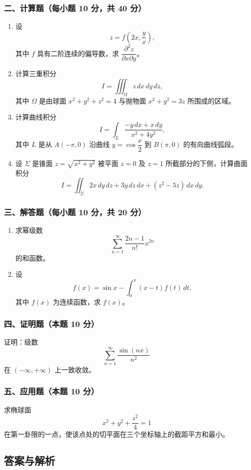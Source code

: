 \subsubsection*{二、计算题（每小题 10 分，共 40 分）}
\begin{enumerate}
  \item 设
  \[
  z=f\!\left(2x,\frac{y}{x}\right),
  \]
  其中 $f$ 具有二阶连续的偏导数，求 $\dfrac{\partial^2z}{\partial x\partial y}$。
  \item 计算三重积分
  \[
  I=\iiint_\Omega z\,dx\,dy\,dz,
  \]
  其中 $\Omega$ 是由球面 $x^2+y^2+z^2=4$ 与抛物面 $x^2+y^2=3z$ 所围成的区域。
  \item 计算曲线积分
  \[
  I=\int_L\frac{-y\,dx+x\,dy}{x^2+4y^2},
  \]
  其中 $L$ 是从 $A(-\pi,0)$ 沿曲线 $y=\cos\dfrac{x}{2}$ 到 $B(\pi,0)$ 的有向曲线弧段。
  \item 设 $\Sigma$ 是锥面 $z=\sqrt{x^2+y^2}$ 被平面 $z=0$ 及 $z=1$ 所截部分的下侧，计算曲面积分
  \[
  I=\iint_\Sigma 2x\,dy\,dz+3y\,dz\,dx+(z^2-5z)\,dx\,dy.
  \]
\end{enumerate}

\subsubsection*{三、解答题（每小题 10 分，共 20 分）}
\begin{enumerate}
  \item 求幂级数
  \[
  \sum_{n=1}^{\infty}\frac{2n-1}{n!}x^{2n}
  \]
  的和函数。
  \item 设
  \[
  f(x)=\sin x-\int_0^x(x-t)f(t)\,dt,
  \]
  其中 $f(x)$ 为连续函数，求 $f(x)$。
\end{enumerate}

\subsubsection*{四、证明题（本题 10 分）}
证明：级数
\[
\sum_{n=1}^{\infty}\frac{\sin(nx)}{n^2}
\]
在 $(-\infty,+\infty)$ 上一致收敛。

\subsubsection*{五、应用题（本题 10 分）}
求椭球面
\[
x^2+y^2+\frac{z^2}{4}=1
\]
在第一卦限的一点，使该点处的切平面在三个坐标轴上的截距平方和最小。

\subsection{答案与解析}

